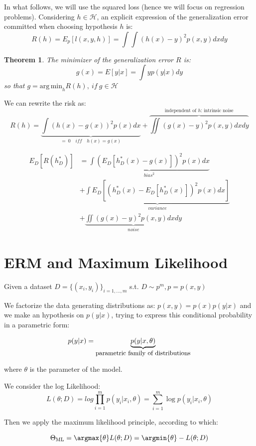In what follows, we will use the squared loss (hence we will focus on
regression problems). Considering $h \in \mathcal H$, an explicit expression of the generalization error committed when choosing hypothesis $h$ is:
$$
R(h) = E_p[l(x,y,h)] = \int \int (h(x) - y)^2 p(x,y) dx dy
$$

\newtheorem{theorem}{Theorem}

\begin{theorem}
    The minimizer of the generalization error $R$ is:
    $$
    \boxed{ g(x) = E[y|x] = \int y p(y|x) dy }
    $$
    so that $g = \mathrm{arg\,min}_h R(h),\ if\ g \in \mathcal H$
\end{theorem}

We can rewrite the risk as:
$$
R(h) = \underbrace{\int (h(x) - g(x))^2 p(x) dx}_{=\ 0 \quad iff \quad h(x) = g(x)} + \overbrace{\iint (g(x) - y)^2 p(x,y) dx dy}^{\text{independent of }h \text{: intrinsic noise}}
$$



$$
\begin{array}{rl}
E_D[R(h^*_D)]
& = \underbrace{\int ( E_D[h^*_D(x) - g(x)])^2 p(x) dx}_{bias^2} \\
& + \underbrace{\int E_D[(h^*_D(x) - E_D[h^*_D(x)])^2 p(x) dx]}_{variance} \\
& + \underbrace{\iint (g(x) - y)^2 p(x,y) dx dy}_{noise}
\end{array}
$$

\section{ERM and Maximum Likelihood}

Given a dataset $D = \{(x_i, y_i)\}_{i=1, \dots, m}$ s.t. $D \sim p^m, p = p(x,y)$

We factorize the data generating distributions as: $p(x,y) = p(x) p(y|x)$ and we make an hypothesis on $p(y|x)$, trying to express this conditional probability in a parametric form:

$$p(y|x) = \underbrace{p(y|x, \theta)}_\text{\small parametric family of distributions}$$

where $\theta$ is the parameter of the model.

We consider the log Likelihood:
$$
L(\theta; D) = log \prod_{i = 1}^{m} p(y_i|x_i, \theta) = \sum_{i = 1}^m \log p(y_i | x_i, \theta)
$$

Then we apply the maximum likelihood principle, according to which:

$$
\Theta_{\text{ML}} = \argmax{\theta} L(\theta; D) = \argmin{\theta} - L(\theta; D)
$$

